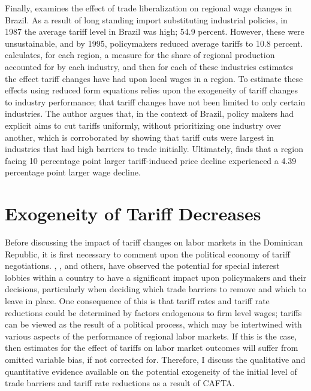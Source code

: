 \documentclass[12pt]{article}
\begin{document}
Finally, \citet{kovak}  examines 
the effect of trade liberalization on regional wage changes in Brazil. As a result of long standing
import substituting industrial policies, in 1987 the average tariff level in Brazil was high; 
54.9 percent. However, these were unsustainable, and by 1995, policymakers reduced average tariffs 
to 10.8 percent. \citeauthor{kovak} calculates, for each region, a measure for the share of regional production 
accounted for by each industry, and then for each of these industries estimates the effect tariff 
changes have had upon local wages in a region. 
To estimate these effects using reduced form equations relies upon the exogeneity of tariff changes to 
industry performance; that tariff changes have not been limited to only certain industries. 
The author argues that, in the context of Brazil, policy makers had explicit aims to cut tariffs 
uniformly, without prioritizing one industry over another, which is corroborated by showing that 
tariff cuts were largest in industries that had high barriers to trade initially.
Ultimately, \citeauthor{kovak} finds that a region facing 10 percentage point larger tariff-induced 
price decline experienced a 4.39 percentage point larger wage decline.

\vspace{-10pt}
\section{Exogeneity of Tariff Decreases}
\label{sec:Exogeneity}
Before discussing the impact of tariff changes on labor markets in
the Dominican Republic, it is first necessary to comment upon the political economy of
tariff negotiations. \citet{grossman}, \citet{brock1978}, \citet{maggi2007political} and others, 
have observed the potential for special interest lobbies within a country to have a significant 
impact upon policymakers and their decisions, particularly when deciding which trade barriers to 
remove and which to leave in place. One consequence of this is that 
tariff rates and tariff rate reductions could be determined by factors endogenous to firm level
wages; tariffs can be viewed as the result of a political process, which may be intertwined with 
various aspects of the performance of regional labor markets. If this is the case, then estimates 
for the effect of tariffs on labor market outcomes will suffer from omitted variable bias, if not
corrected for. Therefore, I discuss the qualitative and
quantitative evidence available on the potential exogeneity of the initial level of
trade barriers and tariff rate reductions as a result of CAFTA. 
\end{document}
